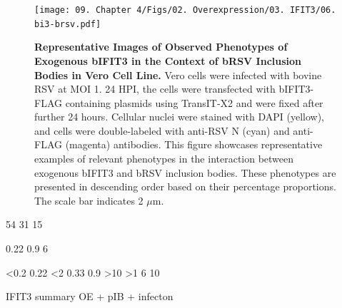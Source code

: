 \begin{figure}
    \centering
    \texttt{[image: 09. Chapter 4/Figs/02. Overexpression/03. IFIT3/06. bi3-brsv.pdf]}
    \caption[Representative Images of Observed Phenotypes of Exogenous bIFIT3 in the Context of bRSV Inclusion Bodies in Vero Cell Line.]{\textbf{Representative Images of Observed Phenotypes of Exogenous bIFIT3 in the Context of bRSV Inclusion Bodies in Vero Cell Line.} Vero cells were infected with bovine RSV at MOI 1. 24 HPI, the cells were transfected with bIFIT3-FLAG containing plasmids using TransIT-X2 and were fixed after further 24 hours. Cellular nuclei were stained with DAPI (yellow), and cells were double-labeled with anti-RSV N (cyan) and anti-FLAG (magenta) antibodies. This figure showcases representative examples of relevant phenotypes in the interaction between exogenous bIFIT3 and bRSV inclusion bodies. These phenotypes are presented in descending order based on their percentage proportions. The scale bar indicates 2 \(\mu \mbox{m}\).}
    \label{fig:Representative Images of Observed Phenotypes of Exogenous bIFIT3 in the Context of bRSV Inclusion Bodies in VERO Cell Line}
\end{figure}

54 31 15

0.22 0.9 6

<0.2 0.22 <2
0.33 0.9 >10
>1 6 10

IFIT3 summary OE + pIB + infecton

